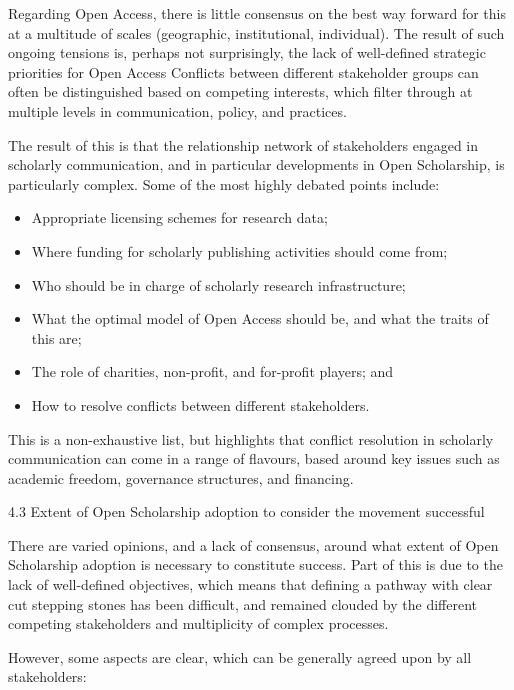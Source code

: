 \documentclass[]{article}
\providecommand{\tightlist}{%
  \setlength{\itemsep}{0pt}\setlength{\parskip}{0pt}}
\begin{document}
Regarding Open Access, there is little consensus on the best way forward
for this at a multitude of scales (geographic, institutional,
individual). The result of such ongoing tensions is, perhaps not
surprisingly, the lack of well-defined strategic priorities for Open
Access Conflicts between different stakeholder groups can often be
distinguished based on competing interests, which filter through at
multiple levels in communication, policy, and practices.

The result of this is that the relationship network of stakeholders
engaged in scholarly communication, and in particular developments in
Open Scholarship, is particularly complex. Some of the most highly
debated points include:

\begin{itemize}
\tightlist
\item
  Appropriate licensing schemes for research data;
\item
  Where funding for scholarly publishing activities should come from;
\item
  Who should be in charge of scholarly research infrastructure;
\item
  What the optimal model of Open Access should be, and what the traits
  of this are;
\item
  The role of charities, non-profit, and for-profit players; and
\item
  How to resolve conflicts between different stakeholders.
\end{itemize}

This is a non-exhaustive list, but highlights that conflict resolution
in scholarly communication can come in a range of flavours, based around
key issues such as academic freedom, governance structures, and
financing.

4.3 Extent of Open Scholarship adoption to consider the movement
successful

There are varied opinions, and a lack of consensus, around what extent
of Open Scholarship adoption is necessary to constitute success. Part of
this is due to the lack of well-defined objectives, which means that
defining a pathway with clear cut stepping stones has been difficult,
and remained clouded by the different competing stakeholders and
multiplicity of complex processes.

However, some aspects are clear, which can be generally agreed upon by
all stakeholders:
\end{document}

